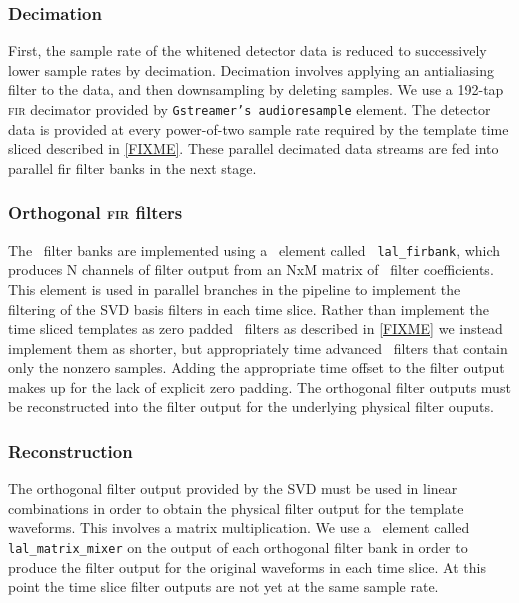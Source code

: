 \subsubsection{Decimation}

First, the sample rate of the whitened detector data is reduced to successively
lower sample rates by decimation.  Decimation involves applying an antialiasing
filter to the data, and then downsampling by deleting samples.  We use a
192-tap \textsc{fir} decimator provided by {\tt Gstreamer's audioresample}
element.  The detector data is provided at every power-of-two sample rate
required by the template time sliced described in \eqref{FIXME}.  These
parallel decimated data streams are fed into parallel fir filter banks in the
next stage.

\subsubsection{Orthogonal \textsc{fir} filters}

The \fir\ filter banks are implemented using a \gstlal\ element called {\tt
lal\_firbank}, which produces N channels of filter output from an NxM matrix of
\fir\ filter coefficients.  This element is used in parallel branches in the
pipeline to implement the filtering of the SVD basis filters in each time
slice.  Rather than implement the time sliced templates as zero padded \fir\
filters as described in \eqref{FIXME} we instead implement them as shorter, but
appropriately time advanced \fir\ filters that contain only the nonzero
samples.  Adding the appropriate time offset to the filter output makes up for
the lack of explicit zero padding.  The orthogonal filter outputs must be
reconstructed into the filter output for the underlying physical filter ouputs. 

\subsubsection{Reconstruction}

The orthogonal filter output provided by the SVD must be used in linear
combinations in order to obtain the physical filter output for the template
waveforms.  This involves a matrix multiplication.  We use a \gstlal\ element
called {\tt lal\_matrix\_mixer} on the output of each orthogonal filter bank in
order to produce the filter output for the original waveforms in each time
slice.  At this point the time slice filter outputs are not yet at the same
sample rate.

